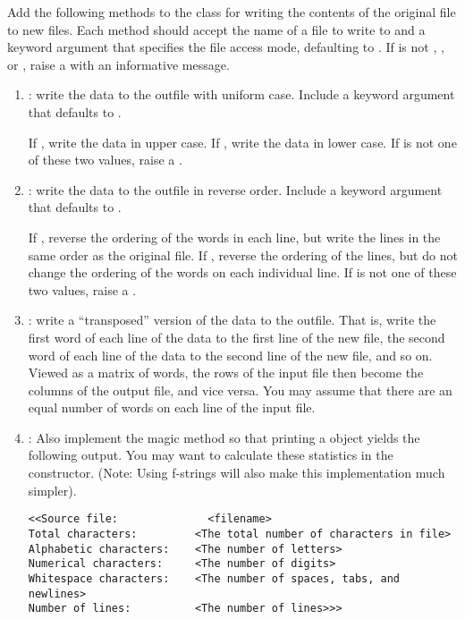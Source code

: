 \begin{problem} %
Add the following methods to the  class for writing the contents of the original file to new files.
Each method should accept the name of a file to write to and a keyword argument  that specifies the file access mode, defaulting to .
If  is not , , or , raise a  with an informative message.

\begin{enumerate}
\item {}: write the data to the outfile with uniform case. Include a keyword argument  that defaults to .

If , write the data in upper case.
If , write the data in lower case.
If  is not one of these two values, raise a .

\item {}: write the data to the outfile in reverse order. Include a keyword argument  that defaults to .

If , reverse the ordering of the words in each line, but write the lines in the same order as the original file.
If , reverse the ordering of the lines, but do not change the ordering of the words on each individual line.
If  is not one of these two values, raise a .

\item {}: write a ``transposed'' version of the data to the outfile.
That is, write the first word of each line of the data to the first line of the new file, the second word of each line of the data to the second line of the new file, and so on.
Viewed as a matrix of words, the rows of the input file then become the columns of the output file, and vice versa.
You may assume that there are an equal number of words on each line of the input file.

\item {}: Also implement the  magic method so that printing a  object yields the following output.
You may want to calculate these statistics in the constructor. (Note: Using f-strings will also make this implementation much simpler).

\begin{lstlisting}
<<Source file:              <filename>
Total characters:         <The total number of characters in file>
Alphabetic characters:    <The number of letters>
Numerical characters:     <The number of digits>
Whitespace characters:    <The number of spaces, tabs, and newlines>
Number of lines:          <The number of lines>>>
\end{lstlisting}


\end{enumerate}
\end{problem}

